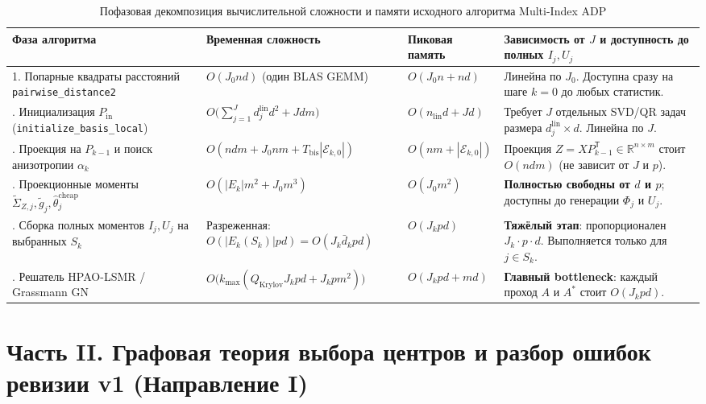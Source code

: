 \documentclass[11pt,a4paper]{article}
\newcommand{\R}{\mathbb{R}}
\newcommand{\T}{^{\mathsf{T}}}
\newcommand{\PEDR}{P}
\newcommand{\init}{\mathrm{in}}
\theoremstyle{definition}
\theoremstyle{remark}
\begin{document}
\begin{table}[ht!]
\centering
\caption{Пофазовая декомпозиция вычислительной сложности и памяти исходного алгоритма Multi-Index ADP}
\label{tab:complexity_baseline}
\small
\begin{tabularx}{\textwidth}{@{}p{34mm}p{38mm}p{36mm}L@{}}
\toprule
\textbf{Фаза алгоритма} & \textbf{Временная сложность} & \textbf{Пиковая память} & \textbf{Зависимость от $J$ и доступность до полных $I_j, U_j$} \\
. Попарные квадраты расстояний \texttt{pairwise\_distance2} & $O(J_0 n d)$ (один BLAS GEMM) & $O(J_0 n + n d)$ & Линейна по $J_0$. Доступна сразу на шаге $k=0$ до любых статистик. \\
. Инициализация $\PEDR_{\init}$ (\texttt{initialize\_basis\_local}) & $O\bigl(\sum_{j=1}^J d_j^{\mathrm{lin}} d^2 + J d m\bigr)$ & $O(n_{\mathrm{lin}} d + J d)$ & Требует $J$ отдельных SVD/QR задач размера $d_j^{\mathrm{lin}} \times d$. Линейна по $J$. \\
. Проекция на $P_{k-1}$ и поиск анизотропии $\alpha_k$ & $O(n d m + J_0 n m + T_{\mathrm{bis}} |\mathcal{E}_{k,0}|)$ & $O(n m + |\mathcal{E}_{k,0}|)$ & Проекция $Z = X P_{k-1}\T \in \R^{n \times m}$ стоит $O(n d m)$ (не зависит от $J$ и $p$). \\
. Проекционные моменты $\widetilde{\Sigma}_{Z,j}, \tilde{g}_j, \hat{\theta}_j^{\mathrm{cheap}}$ & $O(|E_k| m^2 + J_0 m^3)$ & $O(J_0 m^2)$ & \textbf{Полностью свободны от $d$ и $p$}; доступны до генерации $\Phi_j$ и $U_j$. \\
. Сборка полных моментов $I_j, U_j$ на выбранных $S_k$ & Разреженная: $O(|E_k(S_k)| p d) = O(J_k \bar{d}_k p d)$ & $O(J_k p d)$ & \textbf{Тяжёлый этап}: пропорционален $J_k \cdot p \cdot d$. Выполняется только для $j \in S_k$. \\
. Решатель HPAO-LSMR / Grassmann GN & $O\bigl(k_{\max}(Q_{\mathrm{Krylov}} J_k p d + J_k p m^2)\bigr)$ & $O(J_k p d + m d)$ & \textbf{Главный bottleneck}: каждый проход $A$ и $A^*$ стоит $O(J_k p d)$. \\
\bottomrule
\end{tabularx}
\end{table}

\section{Часть II. Графовая теория выбора центров и разбор ошибок ревизии v1 (Направление I)}
\label{sec:part2}
\end{document}
